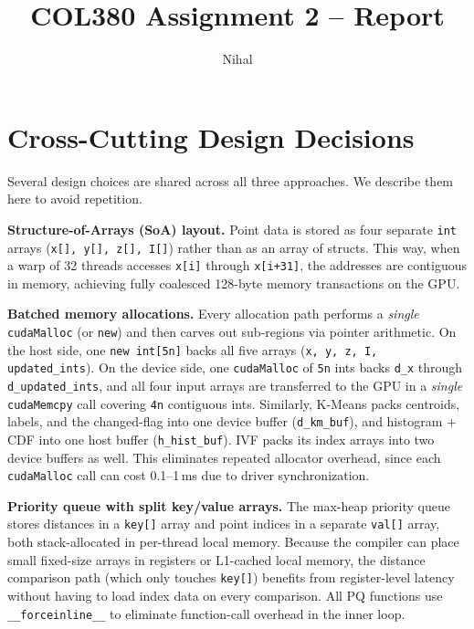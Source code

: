 \documentclass[11pt,a4paper]{article}
\title{\vspace{-2em}\textbf{COL380 Assignment 2 -- Report}\vspace{-0.5em}}
\author{Nihal}
\date{}
\begin{document}
\maketitle
\vspace{-1.5em}

\section{Cross-Cutting Design Decisions}

Several design choices are shared across all three approaches. We describe them here to avoid repetition.

\textbf{Structure-of-Arrays (SoA) layout.}
Point data is stored as four separate \texttt{int} arrays (\texttt{x[], y[], z[], I[]}) rather than as an array of structs.
This way, when a warp of 32 threads accesses \texttt{x[i]} through \texttt{x[i+31]}, the addresses are contiguous in memory, achieving fully coalesced 128-byte memory transactions on the GPU.

\textbf{Batched memory allocations.}
Every allocation path performs a \emph{single} \texttt{cudaMalloc} (or \texttt{new}) and then carves out sub-regions via pointer arithmetic.
On the host side, one \texttt{new int[5n]} backs all five arrays (\texttt{x, y, z, I, updated\_ints}).
On the device side, one \texttt{cudaMalloc} of \texttt{5n} ints backs \texttt{d\_x} through \texttt{d\_updated\_ints}, and all four input arrays are transferred to the GPU in a \emph{single} \texttt{cudaMemcpy} call covering \texttt{4n} contiguous ints.
Similarly, K-Means packs centroids, labels, and the changed-flag into one device buffer (\texttt{d\_km\_buf}), and histogram + CDF into one host buffer (\texttt{h\_hist\_buf}).
IVF packs its index arrays into two device buffers as well.
This eliminates repeated allocator overhead, since each \texttt{cudaMalloc} call can cost 0.1--1\,ms due to driver synchronization.

\textbf{Priority queue with split key/value arrays.}
The max-heap priority queue stores distances in a \texttt{key[]} array and point indices in a separate \texttt{val[]} array, both stack-allocated in per-thread local memory.
Because the compiler can place small fixed-size arrays in registers or L1-cached local memory, the distance comparison path (which only touches \texttt{key[]}) benefits from register-level latency without having to load index data on every comparison.
All PQ functions use \texttt{\_\_forceinline\_\_} to eliminate function-call overhead in the inner loop.
\end{document}
